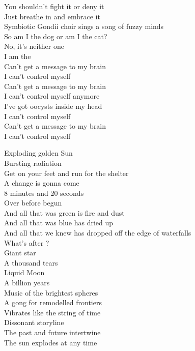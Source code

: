 You shouldn't fight it or deny it \\
Just breathe in and embrace it \\
Symbiotic Gondii choir sings a song of fuzzy minds \\

So am I the dog or am I the cat? \\
No, it's neither one \\
I am the  \\

Can't get a message to my brain \\
I can't control myself \\
Can't get a message to my brain \\
I can't control myself anymore \\
I've got oocysts inside my head \\
I can't control myself \\
Can't get a message to my brain \\
I can't control myself \\




Exploding golden Sun \\
Bursting radiation \\
Get on your feet and run for the shelter \\
A change is gonna come \\
8 minutes and 20 seconds \\
Over before begun \\

And all that was green is fire and dust \\
And all that was blue has dried up \\
And all that we knew has dropped off the edge of waterfalls \\
What's after ? \\

Giant star \\
A thousand tears \\
Liquid Moon \\
A billion years \\
Music of the brightest spheres \\
A gong for remodelled frontiers \\
Vibrates like the string of time \\
Dissonant storyline \\
The past and future intertwine \\
The sun explodes at any time \\

